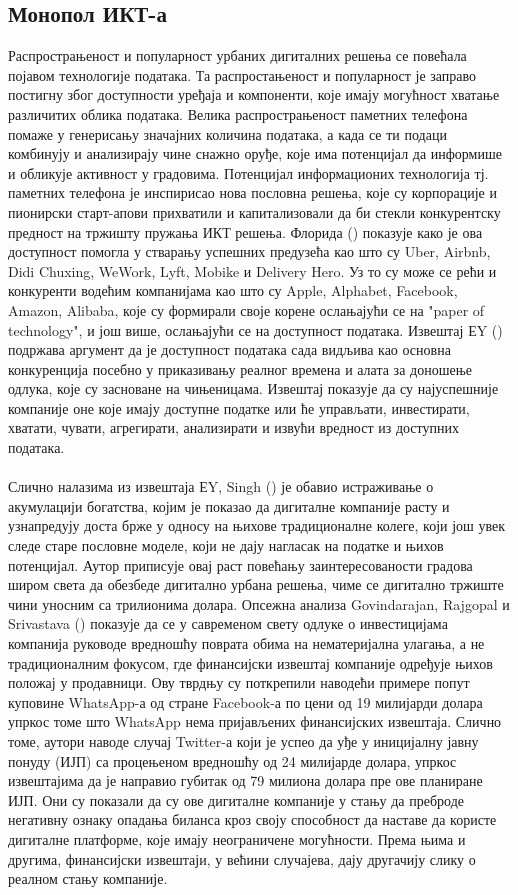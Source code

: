 \documentclass{article}
\begin{document}
\subsection{Монопол ИКТ-а}
Распрострањеност и популарност урбаних дигиталних решења се повећала појавом технологије података. Та распростањеност и популарност је заправо постигну због доступности уређаја и компоненти, које имају могућност хватање различитих облика података. Велика распрострањеност паметних телефона помаже у генерисању значајних количина података, а када се ти подаци комбинују и анализирају чине снажно оруђе, које има потенцијал да информише и обликује активност у градовима. Потенцијал информационих технологија тј. паметних телефона је инспирисао нова пословна решења, које су корпорације и пионирски старт-апови прихватили и капитализовали да би стекли конкурентску предност на тржишту пружања ИКТ решења. Флорида (\cite{florida_2018}) показује како је ова доступност помогла у стварању успешних предузећа као што су Uber, Airbnb, Didi Chuxing, WeWork, Lyft, Mobike и Delivery Hero. Уз то су може се рећи и конкуренти водећим компанијама као што су Apple, Alphabet, Facebook, Amazon, Alibaba, које су формирали своје корене ослањајући се на "paper of technology", и још више, ослањајући се на доступност података. Извештај ЕY (\cite{ey_2014}) подржава аргумент да је доступност података сада видљива као основна конкуренција посебно у приказивању реалног времена и алата за доношење одлука, које су засноване на чињеницама. Извештај показује да су најуспешније компаније оне које имају доступне податке или ће управљати, инвестирати, хватати, чувати, агрегирати, анализирати и извући вредност из доступних података.
\\\\
Слично налазима из извештаја ЕY, Singh (\cite{s_2019}) је обавио истраживање о акумулацији богатства, којим је показао да дигиталне компаније расту и узнапредују доста брже у односу на њихове традиционалне колеге, који још увек следе старе пословне моделе, који не дају нагласак на податке и њихов потенцијал. Аутор приписује овај раст повећању заинтересованости градова широм света да обезбеде дигитално урбана решења, чиме се дигитално тржиште чини уносним са трилионима долара.  Опсежна анализа Govindarajan, Rajgopal и Srivastava (\cite{g_r_s_2018}) показује да се у савременом свету одлуке о инвестицијама компанија руководе вредношћу поврата обима на нематеријална улагања, а не традиционалним фокусом, где финансијски извештај компаније одређује њихов положај у продавници. Ову тврдњу су поткрепили наводећи примере попут куповине WhatsApp-а од стране Facebook-а по цени од 19 милијарди долара упркос томе што WhatsApp нема пријављених финансијских извештаја. Слично томе, аутори наводе случај Twitter-а који је успео да уђе у иницијалну јавну понуду (ИЈП) са процењеном вредношћу од 24 милијарде долара, упркос извештајима да је направио губитак од 79 милиона долара пре ове планиране ИЈП. Они су показали да су ове дигиталне компаније у стању да преброде негативну ознаку опадања биланса кроз своју способност да наставе да користе дигиталне платформе, које имају неограничене могућности. Према њима и другима, финансијски извештаји, у већини случајева, дају другачију слику о реалном стању компаније.
\end{document}
